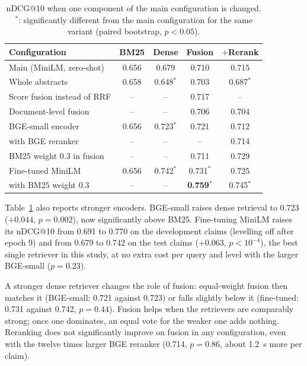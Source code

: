 \documentclass[runningheads]{llncs}
\begin{document}
\begin{table}[t]
\centering\footnotesize
\caption{nDCG@10 when one component of the main configuration is changed.
$^{*}$: significantly different from the main configuration for the same
variant (paired bootstrap, $p<0.05$).}
\label{tab:configs}
\begin{tabular}{@{}lcccc@{}}
\toprule
Configuration & BM25 & Dense & Fusion & $+$Rerank \\
\midrule
Main (MiniLM, zero-shot)    & 0.656 & 0.679 & 0.710 & 0.715 \\
Whole abstracts             & 0.658 & 0.648$^{*}$ & 0.703 & 0.687$^{*}$ \\
Score fusion instead of RRF & --    & --    & 0.717 & --    \\
Document-level fusion       & --    & --    & 0.706 & 0.704 \\
BGE-small encoder           & 0.656 & 0.723$^{*}$ & 0.721 & 0.712 \\
\quad with BGE reranker     & --    & --    & --    & 0.714 \\
BM25 weight 0.3 in fusion   & --    & --    & 0.711 & 0.729 \\
Fine-tuned MiniLM           & 0.656 & 0.742$^{*}$ & 0.731$^{*}$ & 0.725 \\
\quad with BM25 weight 0.3 & --    & --    & \textbf{0.759}$^{*}$ & 0.745$^{*}$ \\
\bottomrule
\end{tabular}
\end{table}

Table~\ref{tab:configs} also reports stronger encoders. BGE-small raises dense
retrieval to 0.723 ($+0.044$, $p=0.002$), now significantly above BM25.
Fine-tuning MiniLM raises its nDCG@10 from 0.691 to 0.770 on the development
claims (levelling off after epoch 9) and from 0.679 to 0.742 on the test claims
($+0.063$, $p<10^{-4}$), the best single retriever in this study, at no extra cost
per query and level with the larger BGE-small ($p=0.23$).

A stronger dense retriever changes the role of fusion: equal-weight fusion then
matches it (BGE-small: 0.721 against 0.723) or falls slightly below it
(fine-tuned: 0.731 against 0.742, $p=0.44$). Fusion helps when the retrievers are
comparably strong; once one dominates, an equal vote for the weaker one adds
nothing. Reranking does not significantly improve on fusion in any configuration,
even with the twelve times larger BGE reranker (0.714, $p=0.86$, about 1.2~s more
per claim).
\end{document}
